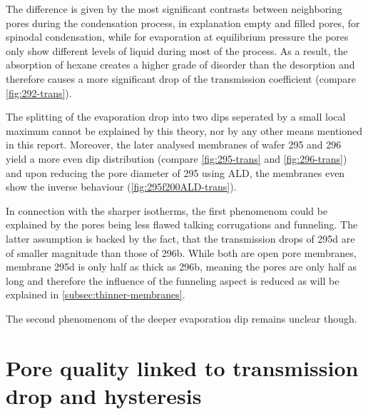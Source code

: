 \documentclass[../thesis.tex]{subfiles}
\begin{document}
          The difference is given by the most significant contrasts between neighboring pores during the condensation process, in explanation empty and filled pores, for spinodal condensation, while for evaporation at equilibrium pressure the pores only show different levels of liquid during most of the process. As a result, the absorption of hexane creates a higher grade of disorder than the desorption and therefore causes a more significant drop of the transmission coefficient (compare \cref{fig:292-trans}).
          \medskip

          The splitting of the evaporation drop into two dips seperated by a small local maximum cannot be explained by this theory, nor by any other means mentioned in this report. Moreover, the later analysed membranes of wafer 295 and 296 yield a more even dip distribution (compare \cref{fig:295-trans} and \cref{fig:296-trans}) and upon reducing the pore diameter of 295 using ALD, the membranes even show the inverse behaviour (\cref{fig:295f200ALD-trans}).

          In connection with the sharper isotherms, the first phenomenom could be explained by the pores being less flawed talking corrugations and funneling. The latter assumption is backed by the fact, that the transmission drops of 295d are of smaller magnitude than those of 296b. While both are open pore membranes, membrane 295d is only half as thick as 296b, meaning the pores are only half as long and therefore the influence of the funneling aspect is reduced as will be explained in \cref{subsec:thinner-membranes}.

          The second phenomenom of the deeper evaporation dip remains unclear though.

          


      \section{Pore quality linked to transmission drop and hysteresis}
      \label{sec:pore-quality-link}
\end{document}
